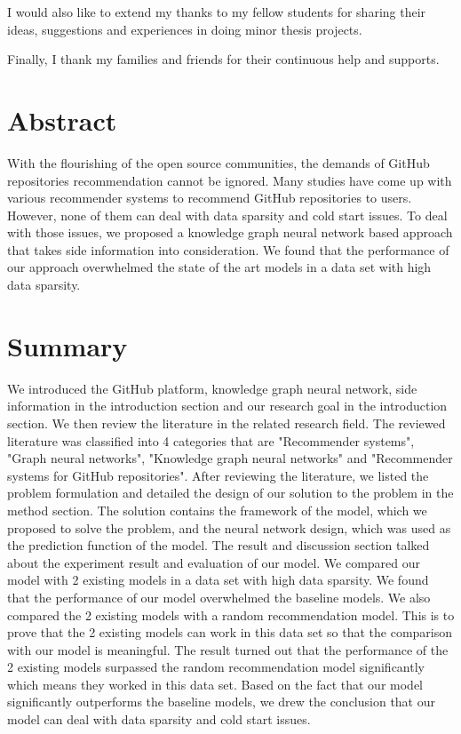\documentclass[11pt,twoside]{report}
\begin{document}
I would also like to extend my thanks to my fellow students for sharing their ideas, suggestions and experiences in doing minor thesis projects.

Finally, I thank my families and friends for their continuous help and supports.

{
    \hypersetup{linkcolor=black}
    \tableofcontents
    \listoffigures
    \listoftables
}


\chapter{Abstract}
With the flourishing of the open source communities, the demands of GitHub repositories recommendation cannot be ignored. Many studies have come up with various recommender systems to recommend GitHub repositories to users. However, none of them can deal with data sparsity and cold start issues. To deal with those issues, we proposed a knowledge graph neural network based approach that takes side information into consideration. We found that the performance of our approach overwhelmed the state of the art models in a data set with high data sparsity.

\chapter{Summary}
We introduced the GitHub platform, knowledge graph neural network, side information in the introduction section and our research goal in the introduction section. We then review the literature in the related research field. The reviewed literature was classified into 4 categories that are "Recommender systems", "Graph neural networks", "Knowledge graph neural networks" and "Recommender systems for GitHub repositories". After reviewing the literature, we listed the problem formulation and detailed the design of our solution to the problem in the method section. The solution contains the framework of the model, which we proposed to solve the problem, and the neural network design, which was used as the prediction function of the model. The result and discussion section talked about the experiment result and evaluation of our model. We compared our model with 2 existing models in a data set with high data sparsity. We found that the performance of our model overwhelmed the baseline models. We also compared the 2 existing models with a random recommendation model. This is to prove that the 2 existing models can work in this data set so that the comparison with our model is meaningful. The result turned out that the performance of the 2 existing models surpassed the random recommendation model significantly which means they worked in this data set. Based on the fact that our model significantly outperforms the baseline models, we drew the conclusion that our model can deal with data sparsity and cold start issues.
\end{document}
